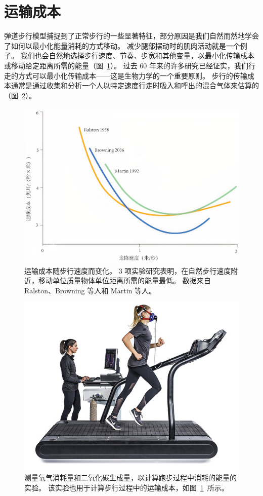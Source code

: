\section{运输成本}

弹道步行模型捕捉到了正常步行的一些显著特征，部分原因是我们自然而然地学会了如何以最小化能量消耗的方式移动。
减少腿部摆动时的肌肉活动就是一个例子。
我们也会自然地选择步行速度、节奏、步宽和其他变量，以最小化传输成本或移动给定距离所需的能量（图~\ref{fig:2_11}）。
过去 60 年来的许多研究已经证实，我们行走的方式可以最小化传输成本——这是生物力学的一个重要原则。
步行的传输成本通常是通过收集和分析一个人以特定速度行走时吸入和呼出的混合气体来估算的（图~\ref{fig:2_12}）。

\begin{figure}[!htb]
	\centering
	\includegraphics[width=0.75\linewidth]{chap2/2_11}
	\caption{运输成本随步行速度而变化。
		3 项实验研究表明，在自然步行速度附近，移动单位质量物体单位距离所需的能量最低。
		数据来自 Ralston\cite{ralston1958energy}、Browning 等人\cite{browning2006effects}和 Martin 等人\cite{martin1992effects}。 \label{fig:2_11}}
\end{figure}

\begin{figure}[!htb]
	\centering
	\includegraphics[width=1.0\linewidth]{chap2/2_12}
	\caption{测量氧气消耗量和二氧化碳生成量，以计算跑步过程中消耗的能量的实验。
		该实验也用于计算步行过程中的运输成本，如图~\ref{fig:2_11}~所示。 \label{fig:2_12}}
\end{figure}


